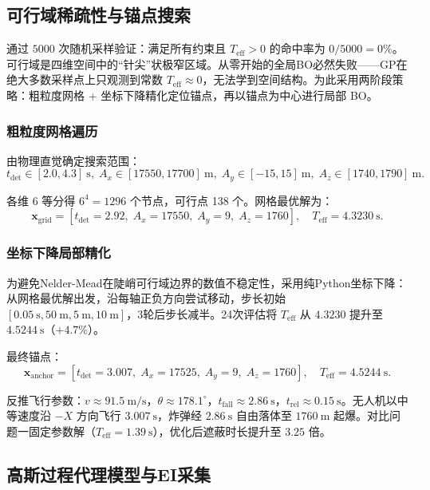 \documentclass{ctexart}
\begin{document}
\subsection{可行域稀疏性与锚点搜索}

通过 $5000$ 次随机采样验证：满足所有约束且 $T_{\text{eff}}>0$ 的命中率为 $0/5000=0\%$。可行域是四维空间中的``针尖''状极窄区域。从零开始的全局BO必然失败——GP在绝大多数采样点上只观测到常数 $T_{\text{eff}}\approx 0$，无法学到空间结构。为此采用两阶段策略：粗粒度网格 + 坐标下降精化定位锚点，再以锚点为中心进行局部 BO。

\subsubsection{粗粒度网格遍历}
由物理直觉确定搜索范围：
\[
t_{\text{det}} \in [2.0, 4.3]\ \mathrm{s},\; A_x \in [17550, 17700]\ \mathrm{m},\; A_y \in [-15, 15]\ \mathrm{m},\; A_z \in [1740, 1790]\ \mathrm{m}.
\]

各维 6 等分得 $6^4=1296$ 个节点，可行点 138 个。网格最优解为：
\[
\mathbf{x}_{\text{grid}} = [t_{\text{det}} = 2.92,\; A_x = 17550,\; A_y = 9,\; A_z = 1760], \quad T_{\text{eff}} = 4.3230\ \mathrm{s}.
\]

\subsubsection{坐标下降局部精化}
为避免Nelder-Mead在陡峭可行域边界的数值不稳定性，采用纯Python坐标下降：从网格最优解出发，沿每轴正负方向尝试移动，步长初始 $[0.05\ \mathrm{s}, 50\ \mathrm{m}, 5\ \mathrm{m}, 10\ \mathrm{m}]$，3轮后步长减半。24次评估将 $T_{\text{eff}}$ 从 $4.3230$ 提升至 $4.5244\ \mathrm{s}$（$+4.7\%$）。

最终锚点：
\[
\mathbf{x}_{\text{anchor}} = [t_{\text{det}} = 3.007,\; A_x = 17525,\; A_y = 9,\; A_z = 1760], \quad T_{\text{eff}} = 4.5244\ \mathrm{s}.
\]

反推飞行参数：$v \approx 91.5\ \mathrm{m/s}$，$\theta \approx 178.1^\circ$，$t_{\text{fall}} \approx 2.86\ \mathrm{s}$，$t_{\text{rel}} \approx 0.15\ \mathrm{s}$。无人机以中等速度沿 $-X$ 方向飞行 $3.007\ \mathrm{s}$，炸弹经 $2.86\ \mathrm{s}$ 自由落体至 $1760\ \mathrm{m}$ 起爆。对比问题一固定参数解（$T_{\text{eff}}=1.39\ \mathrm{s}$），优化后遮蔽时长提升至 $3.25$ 倍。

\subsection{高斯过程代理模型与EI采集}
\end{document}
